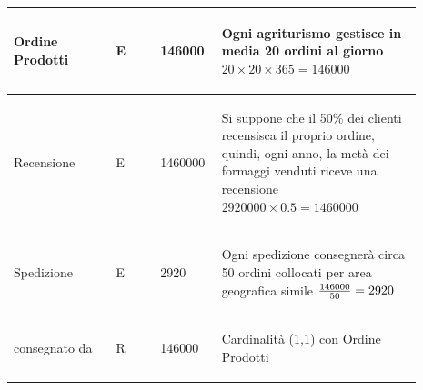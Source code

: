 \documentclass[12pt,a4paper]{article}
\begin{document}
\begin{center}
\begin{longtable}{|p{0.23\linewidth}|p{0.1\linewidth}|p{0.11\linewidth}|p{0.45\linewidth}|}
\hline
Ordine Prodotti
 & 
\begin{center}\vspace{-25pt}E\end{center}
 & 
\begin{center}\vspace{-25pt}146000\end{center}
 & 
\begin{flushleft}\vspace{-25pt} Ogni agriturismo gestisce in media 20 ordini al giorno $20\times 20\times 365 = 146000$\end{flushleft}
\\

\hline
Recensione
 & 
\begin{center}\vspace{-25pt}E\end{center}
 & 
\begin{center}\vspace{-25pt}1460000\end{center}
 & 
\begin{flushleft}\vspace{-25pt}Si suppone che il 50\% dei clienti recensisca il proprio ordine, quindi, ogni anno, la metà dei formaggi venduti riceve una recensione $2920000\times0.5=1460000$\end{flushleft}
\\

\hline
Spedizione
 & 
\begin{center}\vspace{-25pt}E\end{center}
 & 
\begin{center}\vspace{-25pt}2920\end{center}
 & 
\begin{flushleft}\vspace{-25pt}Ogni spedizione consegnerà circa 50 ordini collocati per area geografica simile ${146000\over 50}=2920$\end{flushleft}
\\

\hline
consegnato da
 & 
\begin{center}\vspace{-25pt}R\end{center}
 & 
\begin{center}\vspace{-25pt}146000\end{center}
 & 
\begin{flushleft}\vspace{-25pt}Cardinalità (1,1) con Ordine Prodotti\end{flushleft}
\\


\end{longtable}
\end{center}
\end{document}
